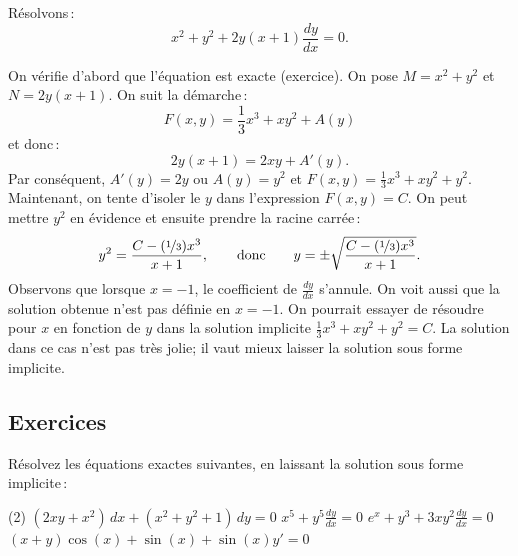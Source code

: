 \begin{example} \label{exact:exampleabove}
Résolvons\,: 
\begin{equation*}
x^2+y^2 + 2y(x+1) \frac{dy}{dx} = 0 .
\end{equation*}

On vérifie d'abord que l'équation est exacte (exercice).  
On pose $M= x^2+y^2$ et $N=2y(x+1)$.
On suit la démarche\,: 
\begin{equation*}
F(x,y) = \frac{1}{3}x^3 + xy^2 + A(y) 
\end{equation*}
et  donc\,: 
\begin{equation*}
2y(x+1) = 2xy + A'(y) .
\end{equation*}
Par conséquent, $A'(y) = 2y$ ou $A(y) = y^2$ et $F(x,y) = \frac{1}{3}x^3 + xy^2 +
y^2$.
Maintenant, on tente d'isoler le $y$ dans l'expression $F(x,y) = C$.  On peut mettre $y^2$ en évidence et ensuite prendre la racine carrée\,: 
%
\begin{equation*}
y^2 = \frac{C-(\nicefrac{1}{3})x^3}{x+1},
\qquad \text{donc} \qquad
y = \pm \sqrt{\frac{C-(\nicefrac{1}{3})x^3}{x+1}} .
\end{equation*}
Observons que lorsque $x=-1$, le coefficient de $\frac{dy}{dx}$ s'annule.  On voit aussi que la solution obtenue n'est pas définie en $x=-1$.  On pourrait essayer de résoudre pour $x$ en fonction de $y$ dans la solution implicite $\frac{1}{3}x^3 + xy^2 + y^2 = C$.  La solution dans ce cas n'est pas très jolie; il vaut mieux laisser la solution sous forme implicite.
\end{example}



\subsection{Exercices}

\begin{exercise}
Résolvez les équations exactes suivantes, en laissant la solution sous forme implicite\,:
\begin{tasks}(2)
\task
$(2 xy + x^2) \, dx + (x^2+y^2+1) \, dy = 0$
\task
$x^5 + y^5 \frac{dy}{dx} = 0$
\task
$e^x+y^3 + 3xy^2 \frac{dy}{dx} = 0$
\task
$(x+y)\cos(x)+\sin(x) + \sin(x)y' = 0$
\end{tasks}
\end{exercise}



